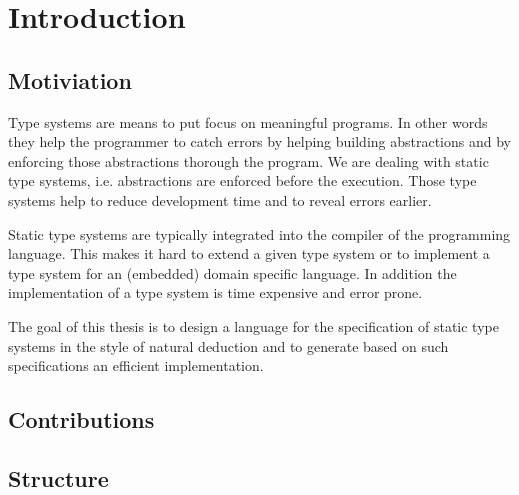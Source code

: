 \documentclass[a4paper,twoside]{report}
\begin{document}


\newpage
\thispagestyle{empty}
\mbox{}



\begin{abstract}

\end{abstract}

\tableofcontents


\chapter{Introduction}
\section{Motiviation}
Type systems are means to put focus on meaningful programs. In other
words they help the programmer to catch errors by helping building
abstractions and by enforcing those abstractions thorough the
program. We are dealing with static type systems, i.e. abstractions
are enforced before the execution. Those type systems help to reduce
development time and to reveal errors earlier. 

Static type systems are typically integrated into the compiler of the
programming language.  This makes it hard to extend a
given type system or to implement a type system for an (embedded)
domain specific language. In addition the implementation of a type
system is time expensive and error prone.

The goal of this thesis is to design a language for the specification
of static type systems in the style of natural deduction and to
generate based on such specifications an efficient implementation.
\section{Contributions}
\section{Structure}
\end{document}
